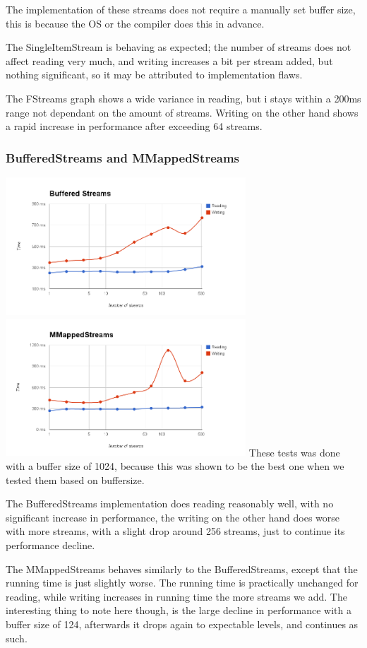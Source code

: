 The implementation of these streams does not require a manually set buffer size, this is because the OS or the compiler does this in advance. 

The SingleItemStream is behaving as expected; the number of streams does not affect reading very much, and writing increases a bit per stream added, but nothing significant, so it may be attributed to implementation flaws. 

The FStreams graph shows a wide variance in reading, but i stays within a 200ms range not dependant on the amount of streams. Writing on the other hand shows a rapid increase in performance after exceeding 64 streams. 

\subsubsection{BufferedStreams and MMappedStreams}
\includegraphics[width=90mm]{parts/BS.png}
\includegraphics[width=90mm]{parts/MMS.png}
These tests was done with a buffer size of 1024, because this was shown to be the best one when we tested them based on buffersize. 

The BufferedStreams implementation does reading reasonably well, with no significant increase in performance, the writing on the other hand does worse with more streams, with a slight drop around 256 streams, just to continue its performance decline. 

The MMappedStreams behaves similarly to the BufferedStreams, except that the running time is just slightly worse. The running time is practically unchanged for reading, while writing increases in running time the more streams we add. The interesting thing to note here though, is the large decline in performance with a buffer size of 124, afterwards it drops again to expectable levels, and continues as such. 


